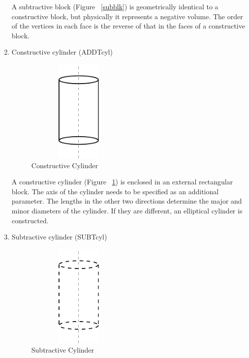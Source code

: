 \begin{enumerate}
        A subtractive block (Figure ~\ref{subblk}) is geometrically identical
        to a constructive block, but physically it represents a
        negative volume. The order of the vertices in each face is the reverse 
		of that in the faces of a constructive block.

    \item
    Constructive cylinder (ADDTcyl)
	
	        \begin{figure}[htbp]
            \hspace{4cm}	        
	        \includegraphics[width=2.0in,height=2.0in]{ADDCYl.pdf}
	            \caption{Constructive Cylinder}
	            \label{addcyl}
	        \end{figure}
        A constructive cylinder (Figure ~\ref{addcyl}) is 
        enclosed in an external rectangular block. The axis of the cylinder 
		needs
        to be specified as an additional parameter. The lengths in the other two
        directions determine the major and minor diameters of the cylinder. If
        they are different, an elliptical cylinder is constructed.

    \item
    Subtractive cylinder (SUBTcyl)

        \begin{figure}[htbp]
                      \hspace{4cm}
          \includegraphics[width=2.0in,height=2.0in]{SUBCYL.pdf}
            \caption{Subtractive Cylinder}
            \label{subcyl}
        \end{figure}


\end{enumerate}
